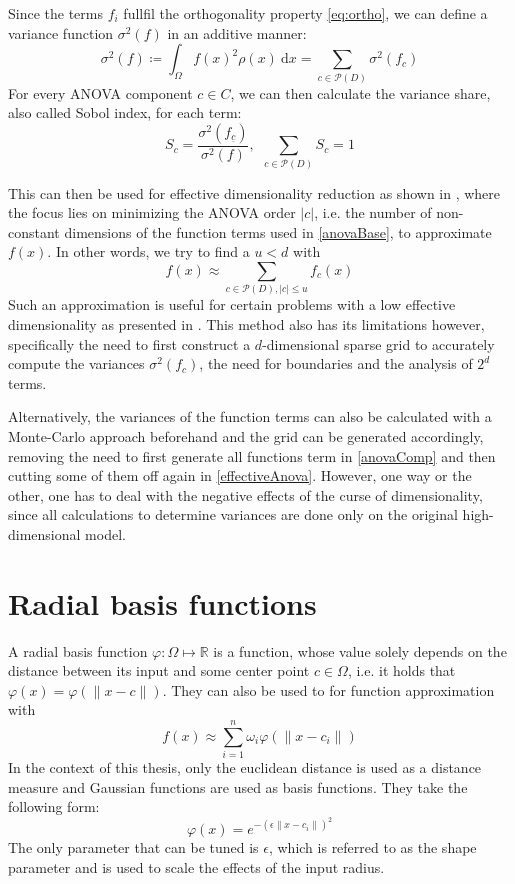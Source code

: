 \documentclass[
  a4paper,  %
  twoside,  %
  bibliography=totoc,
  headsepline,
  cleardoublepage=empty,
  parskip=half,
  draft=false
]{scrbook}
\begin{document}
Since the terms $f_i$ fullfil the orthogonality property \eqref{eq:ortho}, we can define a variance function $\sigma^2(f)$ in an additive manner:
\begin{equation}
\sigma^2(f) \coloneqq \int_{\Omega} f(x)^2 \rho(x) ~ \text{d} x=\sum_{c \in \mathcal{P}(D)} \sigma^2(f_c)
\end{equation}
For every ANOVA component $c \in C$, we can then calculate the variance share, also called Sobol index, for each term:
\begin{equation}
S_{c}=\frac{\sigma^2(f_{\underline{c}} )}{\sigma^2(f)}, ~~ \sum_{c \in \mathcal{P}(D)} S_{c} = 1
\nonumber
\end{equation}

This can then be used for effective dimensionality reduction as shown in \cite{G13,F10}, where the focus lies on minimizing the ANOVA order $|c|$, i.e. the number of non-constant dimensions of the function terms used in \eqref{anovaBase}, to approximate $f(x)$.
In other words, we try to find a $u < d$ with
\begin{equation}
f(x) \approx \sum_{c \in \mathcal{P}(D), |c| \leq u} f_c(x)
\label{effectiveAnova}
\end{equation}
Such an approximation is useful for certain problems with a low effective dimensionality as presented in \cite{H08}.
This method also has its limitations however, specifically the need to first construct a $d$-dimensional sparse grid to accurately compute the variances $\sigma^2(f_c)$, the need for boundaries and the analysis of $2^d$ terms.

Alternatively, the variances of the function terms can also be calculated with a Monte-Carlo approach \cite{} beforehand and the grid can be generated accordingly, removing the need to first generate all functions term in \cref{anovaComp} and then cutting some of them off again in \cref{effectiveAnova}.
However, one way or the other, one has to deal with the negative effects of the curse of dimensionality, since all calculations to determine variances are done only on the original high-dimensional model.


\section{Radial basis functions}

A radial basis function $\varphi \colon \Omega \mapsto \mathds{R}$ is a function, whose value solely depends on the distance between its input and some center point $c \in \Omega$, i.e. it holds that $\varphi(x)=\varphi(\|x - c\|)$.
They can also be used to for function approximation with 
\begin{equation}
f(x) \approx \sum_{i=1}^n \omega_i \varphi(\|x - c_i\|)
\end{equation}
In the context of this thesis, only the euclidean distance is used as a distance measure and Gaussian functions \cite{} are used as basis functions.
They take the following form:
\begin{equation}
\varphi(x)=e^{-(\epsilon \|x - c_i\|)^2}
\end{equation}
The only parameter that can be tuned is $\epsilon$, which is referred to as the shape parameter and is used to scale the effects of the input radius.
\end{document}
